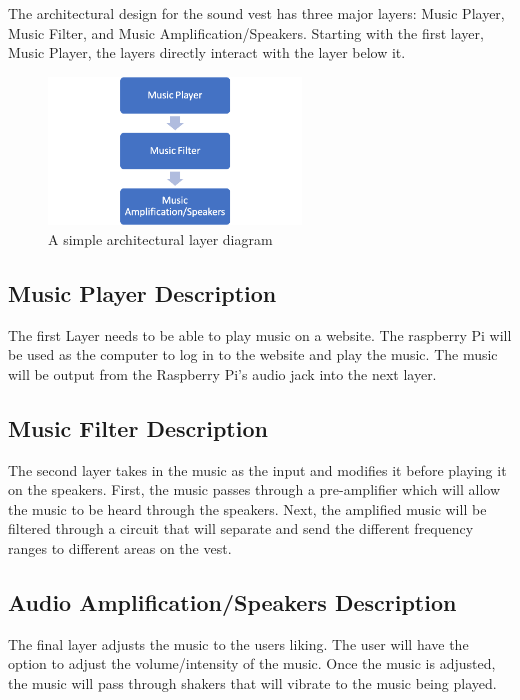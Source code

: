 The architectural design for the sound vest has three major layers: Music Player, Music Filter, and Music Amplification/Speakers. Starting with the first layer, Music Player, the layers directly interact with the layer below it. 

\begin{figure}[h!]
	\centering
 	\includegraphics[width=0.60\textwidth]{images/layers}
 \caption{A simple architectural layer diagram}
\end{figure}

\subsection{Music Player Description}
The first Layer needs to be able to play music on a website. The raspberry Pi will be used as the computer to log in to the website and play the music. The music will be output from the Raspberry Pi's audio jack into the next layer. 

\subsection{Music Filter Description}
The second layer takes in the music as the input and modifies it before playing it on the speakers. First, the music passes through a pre-amplifier which will allow the music to be heard through the speakers. Next, the amplified music will be filtered through a circuit that will separate and send the different frequency ranges to different areas on the vest.

\subsection{Audio Amplification/Speakers Description}
 The final layer adjusts the music to the users liking. The user will have the option to adjust the volume/intensity of the music. Once the music is adjusted, the music will pass through shakers that will vibrate to the music being played.